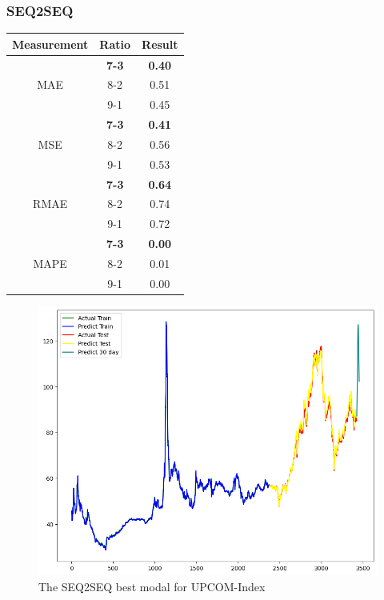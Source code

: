 \documentclass{ieeeojies}
\begin{document}
\subsubsection{SEQ2SEQ}
\begin{table}[H]
    \centering
    \begin{tabular}{|c|c|c|}
        \hline
         Measurement & Ratio &  Result  \\
        \hline
             & \textbf{7-3} & \textbf{0.40} \\
        MAE  & 8-2 & 0.51  \\
            & 9-1 & 0.45 \\
        \hline
           & \textbf{7-3} &\textbf{ 0.41}  \\
        MSE  & 8-2 & 0.56 \\
            & 9-1 & 0.53  \\
        \hline
           & \textbf{7-3} & \textbf{0.64} \\
        RMAE  & 8-2 & 0.74  \\
            & 9-1 & 0.72 \\
        \hline
           & \textbf{7-3} & \textbf{0.00}  \\
        MAPE  & 8-2 & 0.01  \\
            & 9-1 & 0.00 \\
        \hline
    \end{tabular}
    \label{table:example}
\end{table}
\begin{figure}[H]
    \centering
    \includegraphics[width=0.8\linewidth]{SE UPC 73.jpg}
    \caption{The SEQ2SEQ best modal for UPCOM-Index}
    \label{fig:example}
\end{figure}
\end{document}
